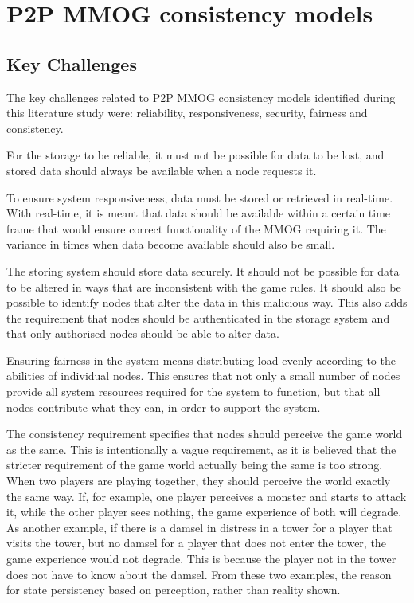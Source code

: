 \documentclass[journal,oneside,a4paper,onecolumn]{IEEEtran}
\begin{document}
\section{P2P MMOG consistency models}
\label{p2p_mmog_cm}

\subsection{Key Challenges}
\label{key_challenges_cm}

The key challenges related to P2P MMOG consistency models identified during this literature study were: reliability, responsiveness, security, fairness and consistency.

For the storage to be reliable, it must not be possible for data to be lost, and stored data should always be available when a node requests it.

To ensure system responsiveness, data must be stored or retrieved in real-time. With real-time, it is meant that data should be available within a certain time frame that would ensure correct functionality of the MMOG requiring it. The variance in times when data become available should also be small.

The storing system should store data securely. It should not be possible for data to be altered in ways that are inconsistent with the game rules. It should also be possible to identify nodes that alter the data in this malicious way. This also adds the requirement that nodes should be authenticated in the storage system and that only authorised nodes should be able to alter data.

Ensuring fairness in the system means distributing load evenly according to the abilities of individual nodes. This ensures that not only a small number of nodes provide all system resources required for the system to function, but that all nodes contribute what they can, in order to support the system.

The consistency requirement specifies that nodes should perceive the game world as the same. This is intentionally a vague requirement, as it is believed that the stricter requirement of the game world actually being the same is too strong. When two players are playing together, they should perceive the world exactly the same way. If, for example, one player perceives a monster and starts to attack it, while the other player sees nothing, the game experience of both will degrade. As another example, if there is a damsel in distress in a tower for a player that visits the tower, but no damsel for a player that does not enter the tower, the game experience would not degrade. This is because the player not in the tower does not have to know about the damsel. From these two examples, the reason for state persistency based on perception, rather than reality shown.
\end{document}
